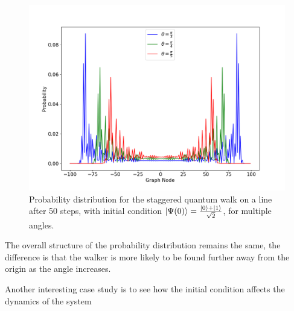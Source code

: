 \documentclass[../../dissertation.tex]{subfiles}
\begin{document}
\begin{figure}[!h]
	\centering
	\includegraphics[scale=0.40]{img/StagQuantumWalk/stagqwMultiple.png}
	\caption{Probability distribution for the staggered quantum walk on a line after 50 steps, with initial condition $\ket{\Psi(0)}=\frac{\ket{0}+\ket{1}}{\sqrt{2}}$, for multiple angles.} 
	\label{fig:fig5}
\end{figure}

The overall structure of the probability distribution remains the same, the difference is that the walker is more likely to be found further away from the origin as the angle increases.\par
Another interesting case study is to see how the initial condition affects the dynamics of the system
\end{document}
